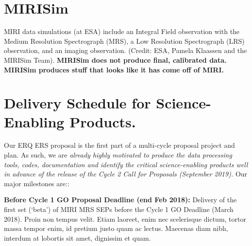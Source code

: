 \section*{MIRISim}
\vspace{-6pt}
MIRI data simulations (at ESA) include an Integral Field observation
with the Medium Resolution Spectrograph (MRS), a Low Resolution
Spectrograph (LRS) observation, and an imaging observation. (Credit:
ESA, Pamela Klaassen and the MIRISim Team).
{\bf MIRISim does not produce final, calibrated data. 
MIRISim produces stuff that looks like it has come off of MIRI.}



\iffalse
\section{Useful links}
http://astroconda.readthedocs.io/en/latest/ \\
https://www.cosmos.esa.int/web/jwst/simulations\\
https://confluence.stsci.edu/display/JWSTDADF/JWST+Data+Analysis+Development+Forum\\
https://jwst.stsci.edu/science-planning/data-analysis-toolbox\\
https://www.youtube.com/watch?v=A024z9CITZs\\
https://jwst.stsci.edu/science-planning/proposal-planning-toolbox/simulated-data\\
\fi


\section*{Delivery Schedule for Science-Enabling Products.} 
\vspace{-6pt}
Our ERQ ERS proposal is the first part of a multi-cycle proposal
project and plan.  As such, we are {\it already highly motivated to
produce the data processing tools, codes, documentation and identify
the critical science-enabling products well in advance of the release
of the Cycle 2 Call for Proposals (September 2019).}
Our major milestones are::

\smallskip
\smallskip
\noindent
{\bf Before Cycle 1 GO Proposal Deadline (end Feb 2018):} 
Delivery of the first set (‘beta’) of MIRI MRS SEPs before the Cycle 1 GO Deadline (March 2018). 
Proin non tempus velit. Etiam laoreet, enim nec scelerisque dictum, tortor massa tempor enim, id pretium justo quam ac lectus. Maecenas diam nibh, interdum at lobortis sit amet, dignissim et quam. 

